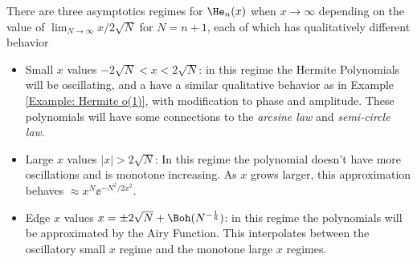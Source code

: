 \begin{exemplo}
	There are three asymptotics regimes for $\He_n(x)$ when $x \rightarrow \infty$ depending on the value of $\lim_{N \rightarrow \infty} x/2\sqrt{N}$ for $N = n+1$, each of which has qualitatively different behavior
	\begin{itemize}
		\item Small $x$ values $-2\sqrt{N} < x < 2\sqrt{N}$: in this regime the Hermite Polynomials will be oscillating, and a have a similar qualitative behavior as in Example \ref{Example: Hermite o(1)}, with modification to phase and amplitude. These polynomials will have some connections to the \textit{arcsine law} and \textit{semi-circle law}.
		\item Large $x$ values $|x| > 2\sqrt{N}$: In this regime the polynomial doesn't have more oscillations and is monotone increasing. As $x$ grows larger, this approximation behaves $\approx x^N \ee^{-N^2/2x^2}$.
		\item Edge $x$ values $x = \pm 2\sqrt{N} + \Boh(N^{-\frac{1}{6}})$: in this regime the polynomials will be approximated by the Airy Function. This interpolates between the oscillatory small $x$ regime and the monotone large $x$ regimes. 
	\end{itemize} 
	

\end{exemplo}
